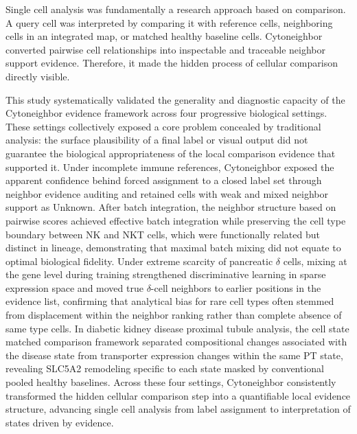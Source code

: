 \documentclass[11pt]{article}
\begin{document}
Single cell analysis was fundamentally a research approach based on comparison. A query cell was interpreted by comparing it with reference cells, neighboring cells in an integrated map, or matched healthy baseline cells. Cytoneighbor converted pairwise cell relationships into inspectable and traceable neighbor support evidence. Therefore, it made the hidden process of cellular comparison directly visible.

This study systematically validated the generality and diagnostic capacity of the Cytoneighbor evidence framework across four progressive biological settings. These settings collectively exposed a core problem concealed by traditional analysis: the surface plausibility of a final label or visual output did not guarantee the biological appropriateness of the local comparison evidence that supported it. Under incomplete immune references, Cytoneighbor exposed the apparent confidence behind forced assignment to a closed label set through neighbor evidence auditing and retained cells with weak and mixed neighbor support as Unknown. After batch integration, the neighbor structure based on pairwise scores achieved effective batch integration while preserving the cell type boundary between NK and NKT cells, which were functionally related but distinct in lineage, demonstrating that maximal batch mixing did not equate to optimal biological fidelity. Under extreme scarcity of pancreatic $\delta$ cells, mixing at the gene level during training strengthened discriminative learning in sparse expression space and moved true $\delta$-cell neighbors to earlier positions in the evidence list, confirming that analytical bias for rare cell types often stemmed from displacement within the neighbor ranking rather than complete absence of same type cells. In diabetic kidney disease proximal tubule analysis, the cell state matched comparison framework separated compositional changes associated with the disease state from transporter expression changes within the same PT state, revealing SLC5A2 remodeling specific to each state masked by conventional pooled healthy baselines. Across these four settings, Cytoneighbor consistently transformed the hidden cellular comparison step into a quantifiable local evidence structure, advancing single cell analysis from label assignment to interpretation of states driven by evidence.
\end{document}
